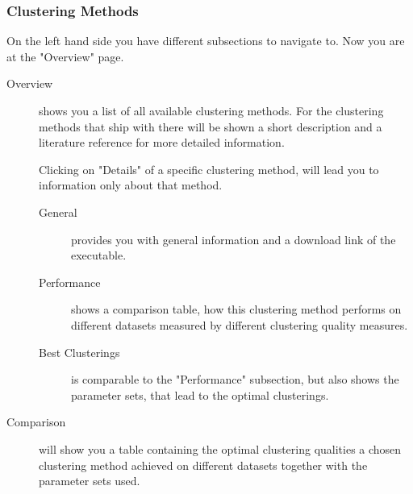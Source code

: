	\subsubsection{Clustering Methods}
	On the left hand side you have different subsections to navigate to. Now you are at the "Overview" page.
	\begin{description}
		\item[Overview] shows you a list of all available clustering methods. For the clustering methods that ship with \clusteval there will be shown a short description and a literature reference for more detailed information.
		
	Clicking on "Details" of a specific clustering method, will lead you to information only about that method.
		\begin{description}
			\item[General] provides you with general information and a download link of the executable.
			\item[Performance] shows a comparison table, how this clustering method performs on different datasets measured by different clustering quality measures.
			\item[Best Clusterings] is comparable to the "Performance" subsection, but also shows the parameter sets, that lead to the optimal clusterings.
		\end{description}
	
	\item[Comparison] will show you a table containing the optimal clustering qualities a chosen clustering method achieved on different datasets together with the parameter sets used.
	\end{description}
	

